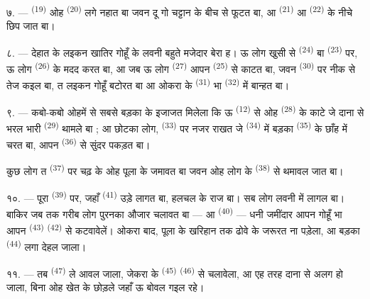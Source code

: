 ७. ---  \textsuperscript{(19)} ओह 
\textsuperscript{(20)} लगे नहात बा जवन दू गो चट्टान के बीच से फूटत बा, आ
 \textsuperscript{(21)} आ 
\textsuperscript{(22)} के नीचे छिप जात बा।

\VUsaut{5.0mm}
\VUsaut{3.4mm}

८. --- देहात के लइकन खातिर गोहूँ के लवनी बहुते मजेदार बेरा ह। ऊ लोग
खुसी से  \textsuperscript{(24)} बा 
\textsuperscript{(23)} पर, ऊ लोग  \textsuperscript{(26)}
के मदद करत बा, आ जब ऊ लोग  \textsuperscript{(27)}
आपन  \textsuperscript{(25)} से काटत बा, जवन  \textsuperscript{(30)} पर नीक से तेज कइल बा, त लइकन गोहूँ बटोरत बा
आ ओकरा के  \textsuperscript{(31)} भा 
\textsuperscript{(32)} में बान्हत बा।

९. --- कबो-कबो ओहमें से सबसे बड़का के इजाजत मिलेला कि ऊ
 \textsuperscript{(12)} से ओह 
\textsuperscript{(28)} के काटे जे दाना से भरल भारी 
\textsuperscript{(29)} थामले बा ; आ छोटका लोग, 
\textsuperscript{(33)} पर नजर राखत जे 
\textsuperscript{(34)} में बड़का 
\textsuperscript{(35)} के छाँह में चरत बा, आपन  \textsuperscript{(36)} से सुंदर 
पकड़त बा।

कुछ लोग त  \textsuperscript{(37)} पर चढ़ के ओह पूला के
जमावत बा जवन ओह लोग के  \textsuperscript{(38)} से थमावल
जात बा।

१०. --- पूरा  \textsuperscript{(39)} पर, जहाँ
 \textsuperscript{(41)} उड़े लागत बा, हलचल के राज बा। सब लोग
लवनी में लागल बा। बाकिर जब तक गरीब लोग पुरनका औजार चलावत बा —
 आ  \textsuperscript{(40)} —
धनी जमींदार आपन गोहूँ भा आपन  \textsuperscript{(43)}
 \textsuperscript{(42)} से कटवावेलें। ओकरा बाद, पूला
के खरिहान तक ढोवे के जरूरत ना पड़ेला, आ बड़का 
\textsuperscript{(44)} लगा देहल जाला।

११. --- तब  \textsuperscript{(47)} ले आवल जाला,
जेकरा के  \textsuperscript{(45)} 
\textsuperscript{(46)} से चलावेला, आ एह तरह दाना  से अलग हो
जाला, बिना ओह खेत के छोड़ले जहाँ ऊ बोवल गइल रहे।

